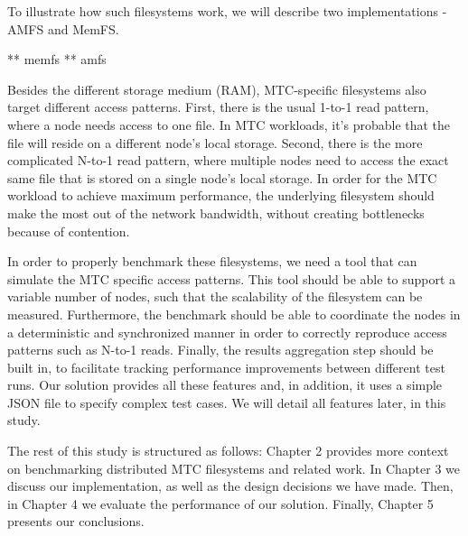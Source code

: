 To illustrate how such filesystems work, we will describe two implementations - AMFS\cite{amfs} and MemFS\cite{memfs}.

** memfs
** amfs



Besides the different storage medium (RAM), MTC-specific filesystems also target different access patterns. First, there is the usual 1-to-1 read pattern, where a node needs access to one file. In MTC workloads, it's probable that the file will reside on a different node's local storage. Second, there is the more complicated N-to-1 read pattern, where multiple nodes need to access the exact same file that is stored on a single node's local storage. In order for the MTC workload to achieve maximum performance, the underlying filesystem should make the most out of the network bandwidth, without creating bottlenecks because of contention.

In order to properly benchmark these filesystems, we need a tool that can simulate the MTC specific access patterns. This tool should be able to support a variable number of nodes, such that the scalability of the filesystem can be measured. Furthermore, the benchmark should be able to coordinate the nodes in a deterministic and synchronized manner in order to correctly reproduce access patterns such as N-to-1 reads. Finally, the results aggregation step should be built in, to facilitate tracking performance improvements between different test runs. Our solution provides all these features and, in addition, it uses a simple JSON\cite{json} file to specify complex test cases. We will detail all features later, in this study.


The rest of this study is structured as follows: Chapter 2 provides more context on benchmarking distributed MTC filesystems and related work. In Chapter 3 we discuss our implementation, as well as the design decisions we have made. Then, in Chapter 4 we evaluate the performance of our solution. Finally, Chapter 5 presents our conclusions.